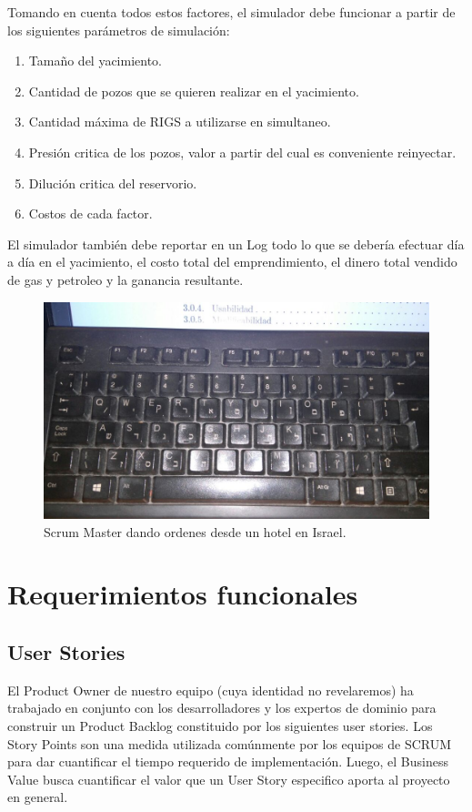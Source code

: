 \documentclass[10pt,a4paper]{article}
\begin{document}
Tomando en cuenta todos estos factores, el simulador debe funcionar a partir de los siguientes parámetros de simulación:
\begin{enumerate}
\item Tamaño del yacimiento.
\item Cantidad de pozos que se quieren realizar en el yacimiento.
\item Cantidad máxima de RIGS a utilizarse en simultaneo.
\item Presión critica de los pozos, valor a partir del cual es conveniente reinyectar.
\item Dilución critica del reservorio.
\item Costos de cada factor.
\end{enumerate}

El simulador también debe reportar en un Log todo lo que se debería efectuar día a día en el yacimiento, el costo total del emprendimiento, el dinero total vendido de gas y petroleo y la ganancia resultante.

\begin{figure}[H]
    \centering
    \includegraphics[scale=0.3]{images/teclado.jpeg}
    \caption{Scrum Master dando ordenes desde un hotel en Israel.}
\end{figure}

\pagebreak

\section{Requerimientos funcionales}

\subsection{User Stories}
El Product Owner de nuestro equipo (cuya identidad no revelaremos) ha trabajado en conjunto con los desarrolladores y los expertos de dominio para construir un Product Backlog constituido por los siguientes user stories. Los Story Points son una medida utilizada comúnmente por los equipos de SCRUM para dar cuantificar el tiempo requerido de implementación. Luego, el Business Value busca cuantificar el valor que un User Story especifico aporta al proyecto en general.
\end{document}
